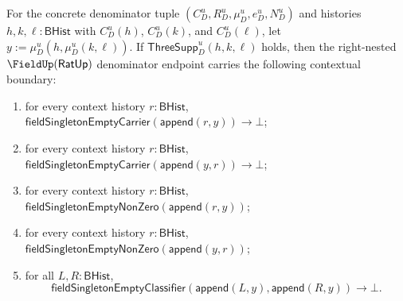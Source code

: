 \begin{theorem}
\label{thm:ratup-fieldup-right-nested-threefold-contextual-boundary}
For the concrete denominator tuple $(C_D^u,R_D^u,\mu_D^u,e_D^u,N_D^u)$ and
histories $h,k,\ell:\mathsf{BHist}$ with $C_D^u(h)$, $C_D^u(k)$, and
$C_D^u(\ell)$, let $y:=\mu_D^u(h,\mu_D^u(k,\ell))$. If
$\mathsf{ThreeSupp}_D^u(h,k,\ell)$ holds, then the right-nested
$\FieldUp(\mathsf{RatUp})$ denominator endpoint carries the following
contextual boundary:
\begin{enumerate}
  \item for every context history $r:\mathsf{BHist}$,
  $\mathsf{fieldSingletonEmptyCarrier}(\mathsf{append}(r,y))\to\bot$;
  \item for every context history $r:\mathsf{BHist}$,
  $\mathsf{fieldSingletonEmptyCarrier}(\mathsf{append}(y,r))\to\bot$;
  \item for every context history $r:\mathsf{BHist}$,
  $\mathsf{fieldSingletonEmptyNonZero}(\mathsf{append}(r,y))$;
  \item for every context history $r:\mathsf{BHist}$,
  $\mathsf{fieldSingletonEmptyNonZero}(\mathsf{append}(y,r))$;
  \item for all $L,R:\mathsf{BHist}$,
  $$
  \mathsf{fieldSingletonEmptyClassifier}(\mathsf{append}(L,y),\mathsf{append}(R,y))
  \to\bot.
  $$
\end{enumerate}
\end{theorem}
